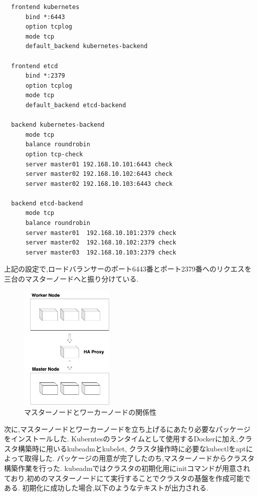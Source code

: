 \begin{lstlisting}
  frontend kubernetes
      bind *:6443
      option tcplog
      mode tcp
      default_backend kubernetes-backend

  frontend etcd
      bind *:2379
      option tcplog
      mode tcp
      default_backend etcd-backend

  backend kubernetes-backend
      mode tcp
      balance roundrobin
      option tcp-check
      server master01 192.168.10.101:6443 check
      server master02 192.168.10.102:6443 check
      server master02 192.168.10.103:6443 check

  backend etcd-backend
      mode tcp
      balance roundrobin
      server master01  192.168.10.101:2379 check
      server master02  192.168.10.102:2379 check
      server master03  192.168.10.103:2379 check
\end{lstlisting}

上記の設定で,ロードバランサーのポート6443番とポート2379番へのリクエスを三台のマスターノードへと振り分けている.

\begin{figure}[htbp]
  \begin{center}
    \includegraphics[width=0.4\textwidth]{./figures/haproxy.jpg}
    \caption{マスターノードとワーカーノードの関係性}
  \end{center}
\end{figure}

次に,マスターノードとワーカーノードを立ち上げるにあたり必要なパッケージをインストールした.
Kuberntesのランタイムとして使用するDockerに加え,クラスタ構築時に用いるkubeadmとkubelet, クラスタ操作時に必要なkubectlをaptによって取得した.
パッケージの用意が完了したのち,マスターノードからクラスタ構築作業を行った.
kubeadmではクラスタの初期化用にinitコマンドが用意されており,初めのマスターノードにて実行することでクラスタの基盤を作成可能である.
初期化に成功した場合,以下のようなテキストが出力される.\\

